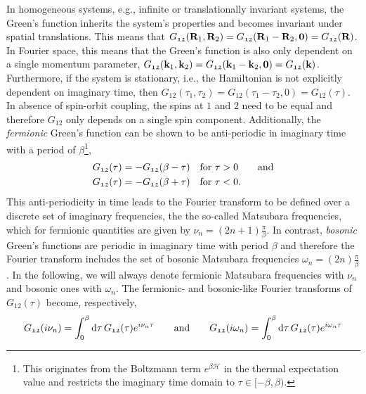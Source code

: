 \documentclass[../../main.tex]{subfiles}
\begin{document}
In homogeneous systems, e.g., infinite or translationally invariant systems, the Green's function inherits the system's properties and becomes invariant under spatial translations. This means that $G_{\mathfrak{12}}(\textbf{R}_1, \textbf{R}_2)=G_{\mathfrak{12}}(\textbf{R}_1-\textbf{R}_2,\textbf{0})=G_{\mathfrak{12}}(\textbf{R})$. In Fourier space, this means that the Green's function is also only dependent on a single momentum parameter, $G_{\mathfrak{12}}(\textbf{k}_1, \textbf{k}_2)=G_{\mathfrak{12}}(\textbf{k}_1-\textbf{k}_2,\textbf{0})=G_{\mathfrak{12}}(\textbf{k})$. Furthermore, if the system is stationary, i.e., the Hamiltonian is not explicitly dependent on imaginary time, then $G_{\mathfrak{12}}(\tau_1, \tau_2)=G_{\mathfrak{12}}(\tau_1-\tau_2,0)=G_{\mathfrak{12}}(\tau)$. In absence of spin-orbit coupling, the spins at $\mathfrak{1}$ and $\mathfrak{2}$ need to be equal and therefore $G_{\mathfrak{12}}$ only depends on a single spin component. Additionally, the \textit{fermionic} Green's function can be shown to be anti-periodic in imaginary time with a period of $\beta$\footnote{This originates from the Boltzmann term $e^{\beta\hat{\mathcal{H}}}$ in the thermal expectation value and restricts the imaginary time domain to $\tau\in[-\beta,\beta)$.},
\begin{subequations}
\begin{align}
	G_{\mathfrak{12}}(\tau)&=-G_{\mathfrak{12}}(\beta-\tau)\quad\text{for } \tau>0 \qquad\text{and}\\
	G_{\mathfrak{12}}(\tau)&=-G_{\mathfrak{12}}(\beta+\tau)\quad\text{for } \tau<0.
\end{align}
\end{subequations}
This anti-periodicity in time leads to the Fourier transform to be defined over a discrete set of imaginary frequencies, the the so-called Matsubara frequencies, which for fermionic quantities are given by $\nu_n=(2n+1)\frac\pi\beta$. In contrast, \textit{bosonic} Green's functions are periodic in imaginary time with period $\beta$ and therefore the Fourier transform includes the set of bosonic Matsubara frequencies $\omega_n=(2n)\frac\pi\beta$. In the following, we will always denote fermionic Matsubara frequencies with $\nu_n$ and bosonic ones with $\omega_n$. The fermionic- and bosonic-like Fourier transforms of $G_{\mathfrak{12}}(\tau)$ become, respectively,
\begin{align}
	G_{\mathfrak{12}}(i\nu_n)=\int_{0}^{\beta}\text{d}\tau\,G_{\mathfrak{12}}(\tau) e^{i\nu_n\tau} \qquad\text{and}\qquad G_{\mathfrak{12}}(i\omega_n)=\int_{0}^{\beta}\text{d}\tau\,G_{\mathfrak{12}}(\tau) e^{i\omega_n\tau}
\end{align}
\end{document}
